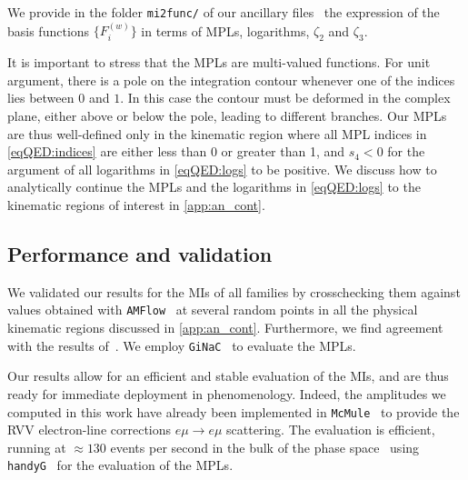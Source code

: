 \documentclass[main.tex]{subfiles}
\begin{document}
We provide in the folder \texttt{mi2func/} of our ancillary files~\cite{zenodo} the expression of the basis functions $\{F^{(w)}_i\}$ in terms of MPLs, logarithms, $\zeta_2$ and $\zeta_3$.

\smallskip

It is important to stress that the MPLs are multi-valued functions.
For unit argument, there is a pole on the integration contour whenever one of the indices lies between $0$ and $1$. In this case the contour must be deformed in the complex plane, either above or below the pole, leading to different branches. Our MPLs are thus well-defined only in the 
kinematic region where all MPL indices in \cref{eqQED:indices} are either less than 0 or greater than 1, and $s_4 < 0$ for the argument of all logarithms in \cref{eqQED:logs} to be positive. We discuss how to analytically continue the MPLs and the logarithms in \cref{eqQED:logs} to the kinematic regions of interest in \cref{app:an_cont}.



\subsection{Performance and validation}
\label{secQED:performance}

We validated our results for the MIs of all families by crosschecking them against values obtained with \texttt{AMFlow}~\cite{Liu:2022chg} at several random points in all the physical kinematic regions discussed in \cref{app:an_cont}. Furthermore, we find agreement with the results of~. We employ \texttt{GiNaC}~\cite{Bauer:2000cp,Vollinga:2004sn} to evaluate the MPLs.

Our results allow for an efficient and stable evaluation of the MIs, and are thus ready for immediate deployment in phenomenology. Indeed, the amplitudes we computed in this work have already been implemented in \texttt{McMule}~\cite{Banerjee:2020rww,ulrich_yannick_2022_6046769} to provide the \acl{RVV} electron-line corrections  $e \mu \to e \mu$ scattering. The evaluation is efficient, running at $\approx 130$ events per second in the bulk of the phase space~\cite{ulrich-radcor} using \texttt{handyG}~\cite{Naterop:2019xaf} for the evaluation of the MPLs.
\end{document}
